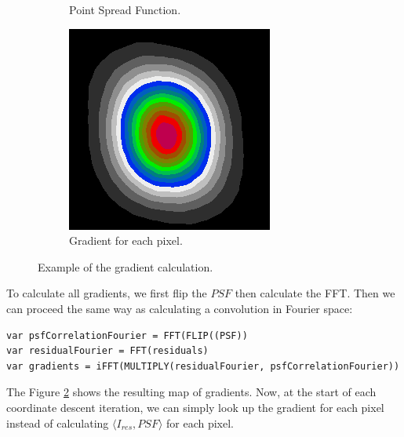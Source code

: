 \begin{figure}[h]
\begin{subfigure}[b]{0.3\linewidth}
		\caption{Point Spread Function.}
		\label{cd:efficient:gradients:psf}
	\end{subfigure}
	\begin{subfigure}[b]{0.3\linewidth}
		\includegraphics[width=\linewidth]{./chapters/03.distribution/simulated/gradients.png}
		\caption{Gradient for each pixel.}
		\label{cd:efficient:gradients:gradients}
	\end{subfigure}
	
	\caption{Example of the gradient calculation.}
	\label{cd:efficient:gradients:figure}
\end{figure}

To calculate all gradients, we first flip the $PSF$ then calculate the FFT. Then we can proceed the same way as calculating a convolution in Fourier space:
\begin{lstlisting}
var psfCorrelationFourier = FFT(FLIP((PSF))
var residualFourier = FFT(residuals)
var gradients = iFFT(MULTIPLY(residualFourier, psfCorrelationFourier))
\end{lstlisting}

The Figure \ref{cd:efficient:gradients:gradients} shows the resulting map of gradients. Now, at the start of each coordinate descent iteration, we can simply look up the gradient for each pixel instead of calculating  $\langle I_{res},PSF\rangle$ for each pixel. 

